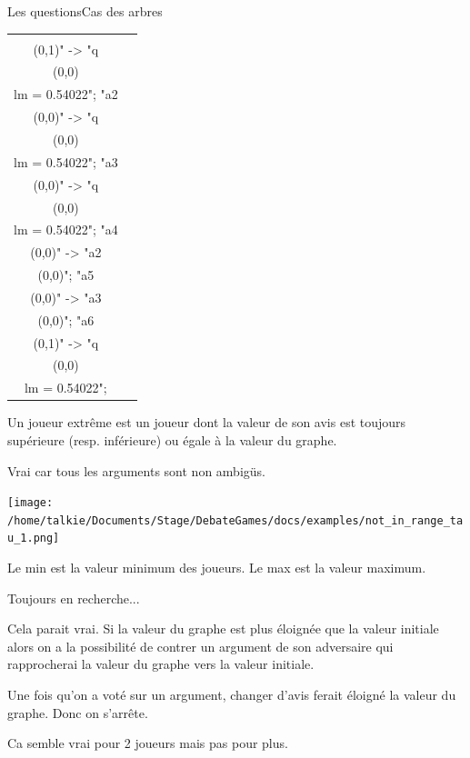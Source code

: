 \documentclass{beamer}
\begin{document}
\begin{frame}{Les questions}{Cas des arbres}
\begin{overprint}
\begin{center}
\begin{tabular}{cc}
          \begin{tikzpicture}[>=stealth]
            \graph [ layered layout, nodes = {scale=0.60, align=center} ] {
            "a1\\ (0,1)" -> "q\\ (0,0)\\lm = 0.54022";
            "a2\\ (0,0)" -> "q\\ (0,0)\\lm = 0.54022";
            "a3\\ (0,0)" -> "q\\ (0,0)\\lm = 0.54022";
            "a4\\ (0,0)" -> "a2\\ (0,0)";
            "a5\\ (0,0)" -> "a3\\ (0,0)";
            "a6\\ (0,1)" -> "q\\ (0,0)\\lm = 0.54022";
            };
          \end{tikzpicture}
        \end{tabular}
      \end{center}

      Un joueur extrême est un joueur dont la valeur de son avis est toujours supérieure (resp. inférieure) ou égale à la valeur du graphe.

      Vrai car tous les arguments sont non ambigüs.

      \begin{center}
        \texttt{[image: /home/talkie/Documents/Stage/DebateGames/docs/examples/not\_in\_range\_tau\_1.png]}
      \end{center}

      Le min est la valeur minimum des joueurs. Le max est la valeur maximum.

      Toujours en recherche...

      Cela parait vrai. Si la valeur du graphe est plus éloignée que la valeur initiale alors on a la possibilité de contrer un argument de son adversaire qui rapprocherai la valeur du graphe vers la valeur initiale.

      Une fois qu'on a voté sur un argument, changer d'avis ferait éloigné la valeur du graphe. Donc on s'arrête.

      \vspace{1cm}
      Ca semble vrai pour 2 joueurs mais pas pour plus.
    \end{overprint}
  \end{frame}
\end{document}

